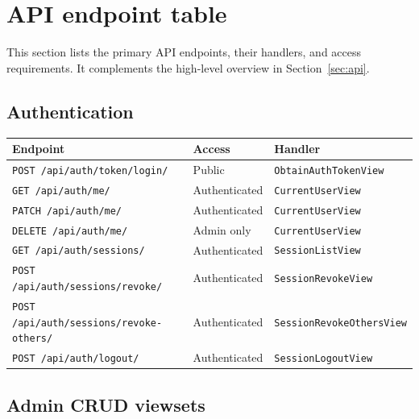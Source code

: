\section{API endpoint table}
\label{sec:api:endpoint-table}

This section lists the primary API endpoints, their handlers, and access requirements. It complements the high-level overview in Section~\ref{sec:api}.

\subsection{Authentication}
\label{subsec:api:endpoints:auth}

\begin{longtable}{p{}p{}p{}}
\toprule
\textbf{Endpoint} & \textbf{Access} & \textbf{Handler} \\
\midrule
\texttt{POST /api/auth/token/login/} & Public & \texttt{ObtainAuthTokenView} \\
\texttt{GET /api/auth/me/} & Authenticated & \texttt{CurrentUserView} \\
\texttt{PATCH /api/auth/me/} & Authenticated & \texttt{CurrentUserView} \\
\texttt{DELETE /api/auth/me/} & Admin only & \texttt{CurrentUserView} \\
\texttt{GET /api/auth/sessions/} & Authenticated & \texttt{SessionListView} \\
\texttt{POST /api/auth/sessions/revoke/} & Authenticated & \texttt{SessionRevokeView} \\
\texttt{POST /api/auth/sessions/revoke-others/} & Authenticated & \texttt{SessionRevokeOthersView} \\
\texttt{POST /api/auth/logout/} & Authenticated & \texttt{SessionLogoutView} \\
\bottomrule
\end{longtable}

\subsection{Admin CRUD viewsets}
\label{subsec:api:endpoints:crud}

